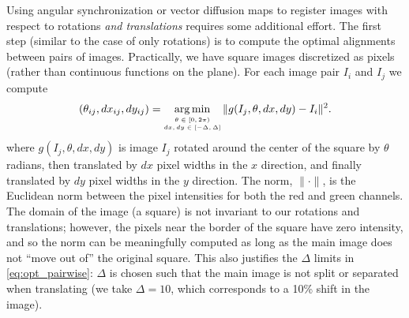 \documentclass{pnastwo}
\DeclareMathOperator*{\argmin}{arg\,min}
\begin{document}
\begin{article}
\begin{materials}
Using angular synchronization or vector diffusion maps to register images with respect to rotations {\em and translations} requires some additional effort.
%
%
%
The first step (similar to the case of only rotations) is to compute the optimal alignments between pairs of images.
%
Practically, we have square images discretized as pixels (rather than continuous functions on the plane).
%
For each image pair $I_i$ and $I_j$ we compute
\begin{equation}\label{eq:opt_pairwise}
(\theta_{ij}, dx_{ij}, dy_{ij}) = \argmin_{
\scriptsize \begin{matrix}
\theta \in [0, 2\pi) \\
dx, dy \in [-\Delta, \Delta]\\
\end{matrix}
} \|g(I_j, \theta, dx, dy) - I_i \|^2.
\end{equation}
where $g(I_j, \theta, dx, dy)$ is image $I_j$ rotated around the center of the square by $\theta$ radians, then translated by $dx$ pixel widths in the $x$ direction, and finally translated by $dy$ pixel widths in the $y$ direction.
%
The norm, $\| \cdot \|$, is the Euclidean norm between the pixel intensities for both the red and green channels.
%
The domain of the image (a square) is not invariant to our rotations and translations; however, the pixels near the border of the square have zero intensity, and so the norm can be meaningfully computed as long as the main image does not ``move out of'' the original square.
%
%
This also justifies the $\Delta$ limits in \eqref{eq:opt_pairwise}: $\Delta$ is chosen such that the main image is not split or separated when translating (we take $\Delta=10$, which corresponds to a 10\% shift in the image). 

\end{materials}
\end{article}
\end{document}
